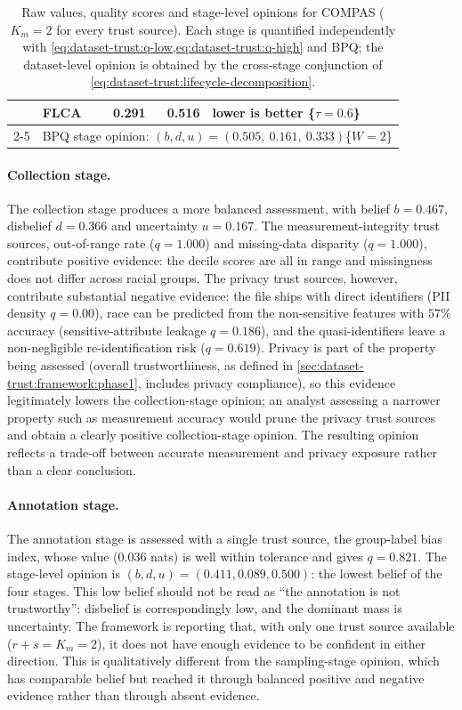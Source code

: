 \begin{table}[!htbp]
\begin{tabular}{@{}llrrl@{}}
      & FLCA                                 & 0.291   & 0.516 & lower is better \{$\tau{=}0.6$\}  \\
    \cmidrule(lr){2-5}
      & \multicolumn{4}{l}{\ac{BPQ} stage opinion: $(b, d, u) = (0.505,\ 0.161,\ 0.333)$\quad \{$W{=}2$\}} \\
    \bottomrule
  \end{tabular}
  \caption{Raw values, quality scores and stage-level opinions for \ac{COMPAS} ($K_m = 2$ for every trust source). Each stage is quantified independently with \cref{eq:dataset-trust:q-low,eq:dataset-trust:q-high} and \ac{BPQ}; the dataset-level opinion is obtained by the cross-stage conjunction of \cref{eq:dataset-trust:lifecycle-decomposition}.}
  \label{tab:dataset-trust:compas}
\end{table}

\paragraph{Collection stage.}
The collection stage produces a more balanced assessment, with belief $b = 0.467$, disbelief $d = 0.366$ and uncertainty $u = 0.167$. The measurement-integrity trust sources, out-of-range rate ($q = 1.000$) and missing-data disparity ($q = 1.000$), contribute positive evidence: the decile scores are all in range and missingness does not differ across racial groups. The privacy trust sources, however, contribute substantial negative evidence: the file ships with direct identifiers (\ac{PII} density $q = 0.00$), race can be predicted from the non-sensitive features with $57\%$ accuracy (sensitive-attribute leakage $q = 0.186$), and the quasi-identifiers leave a non-negligible re-identification risk ($q = 0.619$). Privacy is part of the property being assessed (overall trustworthiness, as defined in \cref{sec:dataset-trust:framework:phase1}, includes privacy compliance), so this evidence legitimately lowers the collection-stage opinion; an analyst assessing a narrower property such as measurement accuracy would prune the privacy trust sources and obtain a clearly positive collection-stage opinion. The resulting opinion reflects a trade-off between accurate measurement and privacy exposure rather than a clear conclusion.

\paragraph{Annotation stage.}
The annotation stage is assessed with a single trust source, the group-label bias index, whose value ($0.036$ nats) is well within tolerance and gives $q = 0.821$. The stage-level opinion is $(b, d, u) = (0.411, 0.089, 0.500)$: the lowest belief of the four stages. This low belief should not be read as ``the annotation is not trustworthy'': disbelief is correspondingly low, and the dominant mass is uncertainty. The framework is reporting that, with only one trust source available ($r + s = K_m = 2$), it does not have enough evidence to be confident in either direction. This is qualitatively different from the sampling-stage opinion, which has comparable belief but reached it through balanced positive and negative evidence rather than through absent evidence.

